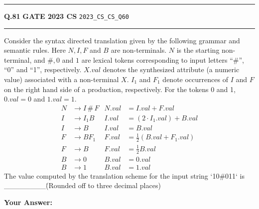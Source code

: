 \documentclass[a4paper,10pt]{article}
\begin{document}
\vspace{6pt}\hrule height 0.35pt\vspace{6pt}
\noindent
\begin{tcolorbox}[
    blanker,
    sidebyside,
    sidebyside align=top,
    lefthand width=0.55\textwidth,
    top=4pt, bottom=4pt, left=0pt, right=0pt,
    middle=16pt,
    underlay={
        \draw[dashed, black!80, line width=0.8pt, dash pattern=on 4pt off 3pt]
            ([xshift=0.55\textwidth+8pt]frame.north west) --
            ([xshift=0.55\textwidth+8pt]frame.south west);
    }
]
\textbf{Q.81}  \hfill {\footnotesize\textbf{GATE 2023 CS} \quad \tiny\texttt{2023\_CS\_CS\_Q60}}
\vspace{2pt}\hrule height 0.3pt\vspace{4pt}

Consider the syntax directed translation given by the following grammar and semantic rules. Here $N, I, F$ and $B$ are non-terminals. $N$ is the starting non-terminal, and $\#, 0$ and $1$ are lexical tokens corresponding to input letters ``\#'', ``0'' and ``1'', respectively. $X.val$ denotes the synthesized attribute (a numeric value) associated with a non-terminal $X$. $I_1$ and $F_1$ denote occurrences of $I$ and $F$ on the right hand side of a production, respectively. For the tokens 0 and 1, $0.val = 0$ and $1.val = 1$.
\begin{align*}
N &\to I \,\#\, F & N.val &= I.val + F.val \\
I &\to I_1 B & I.val &= (2 \cdot I_1.val) + B.val \\
I &\to B & I.val &= B.val \\
F &\to B F_1 & F.val &= \frac{1}{2}(B.val + F_1.val) \\
F &\to B & F.val &= \frac{1}{2}B.val \\
B &\to 0 & B.val &= 0.val \\
B &\to 1 & B.val &= 1.val
\end{align*}
The value computed by the translation scheme for the input string `10\#011` is \_\_\_\_\_\_\_\_\. (Rounded off to three decimal places)

\par\vspace{6pt}\noindent\textbf{Your Answer:} \fbox{\rule{0pt}{1.3ex}\hspace{3cm}}

\tcblower


\end{tcolorbox}
\end{document}
